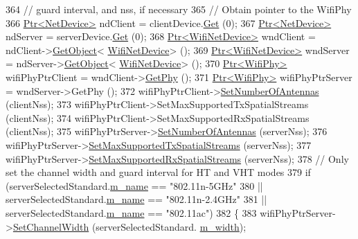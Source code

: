 \begin{DoxyCode}
364   \textcolor{comment}{// guard interval, and nss, if necessary}
365   \textcolor{comment}{// Obtain pointer to the WifiPhy}
366   \hyperlink{classns3_1_1Ptr}{Ptr<NetDevice>} ndClient = clientDevice.\hyperlink{classns3_1_1NetDeviceContainer_a677d62594b5c9d2dea155cc5045f4d0b}{Get} (0);
367   \hyperlink{classns3_1_1Ptr}{Ptr<NetDevice>} ndServer = serverDevice.\hyperlink{classns3_1_1NetDeviceContainer_a677d62594b5c9d2dea155cc5045f4d0b}{Get} (0);
368   \hyperlink{classns3_1_1Ptr}{Ptr<WifiNetDevice>} wndClient = ndClient->\hyperlink{classns3_1_1Object_a13e18c00017096c8381eb651d5bd0783}{GetObject}<
      \hyperlink{classns3_1_1WifiNetDevice}{WifiNetDevice}> ();
369   \hyperlink{classns3_1_1Ptr}{Ptr<WifiNetDevice>} wndServer = ndServer->\hyperlink{classns3_1_1Object_a13e18c00017096c8381eb651d5bd0783}{GetObject}<
      \hyperlink{classns3_1_1WifiNetDevice}{WifiNetDevice}> ();
370   \hyperlink{classns3_1_1Ptr}{Ptr<WifiPhy>} wifiPhyPtrClient = wndClient->\hyperlink{classns3_1_1WifiNetDevice_a6a752f4afd2e28b04c83ba26568efd78}{GetPhy} ();
371   \hyperlink{classns3_1_1Ptr}{Ptr<WifiPhy>} wifiPhyPtrServer = wndServer->GetPhy ();
372   wifiPhyPtrClient->\hyperlink{classns3_1_1WifiPhy_a00b11fc081f04ec36bc814c50861e34f}{SetNumberOfAntennas} (clientNss);
373   wifiPhyPtrClient->SetMaxSupportedTxSpatialStreams (clientNss);
374   wifiPhyPtrClient->SetMaxSupportedRxSpatialStreams (clientNss);
375   wifiPhyPtrServer->\hyperlink{classns3_1_1WifiPhy_a00b11fc081f04ec36bc814c50861e34f}{SetNumberOfAntennas} (serverNss);
376   wifiPhyPtrServer->\hyperlink{classns3_1_1WifiPhy_a4c4529066f8b7aa72ba1c79e59e20ca3}{SetMaxSupportedTxSpatialStreams} (serverNss);
377   wifiPhyPtrServer->\hyperlink{classns3_1_1WifiPhy_a1e4f1ade2676db0ef5b71b7e05c78194}{SetMaxSupportedRxSpatialStreams} (serverNss);
378   \textcolor{comment}{// Only set the channel width and guard interval for HT and VHT modes}
379   \textcolor{keywordflow}{if} (serverSelectedStandard.\hyperlink{structStandardInfo_a101f61fce329acf44c178f191d89bc2b}{m\_name} == \textcolor{stringliteral}{"802.11n-5GHz"}
380       || serverSelectedStandard.\hyperlink{structStandardInfo_a101f61fce329acf44c178f191d89bc2b}{m\_name} == \textcolor{stringliteral}{"802.11n-2.4GHz"}
381       || serverSelectedStandard.\hyperlink{structStandardInfo_a101f61fce329acf44c178f191d89bc2b}{m\_name} == \textcolor{stringliteral}{"802.11ac"})
382     \{
383       wifiPhyPtrServer->\hyperlink{classns3_1_1WifiPhy_ad4be164ac9858e525cf6c6194c39e015}{SetChannelWidth} (serverSelectedStandard.
      \hyperlink{structStandardInfo_a5b3709fd42061dfc2a51115978136abc}{m\_width});

\end{DoxyCode}
